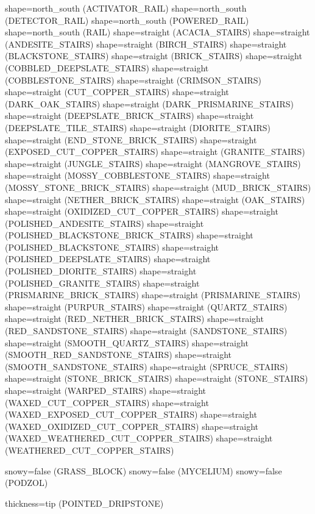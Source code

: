 shape=north_south (ACTIVATOR_RAIL)
shape=north_south (DETECTOR_RAIL)
shape=north_south (POWERED_RAIL)
shape=north_south (RAIL)
shape=straight (ACACIA_STAIRS)
shape=straight (ANDESITE_STAIRS)
shape=straight (BIRCH_STAIRS)
shape=straight (BLACKSTONE_STAIRS)
shape=straight (BRICK_STAIRS)
shape=straight (COBBLED_DEEPSLATE_STAIRS)
shape=straight (COBBLESTONE_STAIRS)
shape=straight (CRIMSON_STAIRS)
shape=straight (CUT_COPPER_STAIRS)
shape=straight (DARK_OAK_STAIRS)
shape=straight (DARK_PRISMARINE_STAIRS)
shape=straight (DEEPSLATE_BRICK_STAIRS)
shape=straight (DEEPSLATE_TILE_STAIRS)
shape=straight (DIORITE_STAIRS)
shape=straight (END_STONE_BRICK_STAIRS)
shape=straight (EXPOSED_CUT_COPPER_STAIRS)
shape=straight (GRANITE_STAIRS)
shape=straight (JUNGLE_STAIRS)
shape=straight (MANGROVE_STAIRS)
shape=straight (MOSSY_COBBLESTONE_STAIRS)
shape=straight (MOSSY_STONE_BRICK_STAIRS)
shape=straight (MUD_BRICK_STAIRS)
shape=straight (NETHER_BRICK_STAIRS)
shape=straight (OAK_STAIRS)
shape=straight (OXIDIZED_CUT_COPPER_STAIRS)
shape=straight (POLISHED_ANDESITE_STAIRS)
shape=straight (POLISHED_BLACKSTONE_BRICK_STAIRS)
shape=straight (POLISHED_BLACKSTONE_STAIRS)
shape=straight (POLISHED_DEEPSLATE_STAIRS)
shape=straight (POLISHED_DIORITE_STAIRS)
shape=straight (POLISHED_GRANITE_STAIRS)
shape=straight (PRISMARINE_BRICK_STAIRS)
shape=straight (PRISMARINE_STAIRS)
shape=straight (PURPUR_STAIRS)
shape=straight (QUARTZ_STAIRS)
shape=straight (RED_NETHER_BRICK_STAIRS)
shape=straight (RED_SANDSTONE_STAIRS)
shape=straight (SANDSTONE_STAIRS)
shape=straight (SMOOTH_QUARTZ_STAIRS)
shape=straight (SMOOTH_RED_SANDSTONE_STAIRS)
shape=straight (SMOOTH_SANDSTONE_STAIRS)
shape=straight (SPRUCE_STAIRS)
shape=straight (STONE_BRICK_STAIRS)
shape=straight (STONE_STAIRS)
shape=straight (WARPED_STAIRS)
shape=straight (WAXED_CUT_COPPER_STAIRS)
shape=straight (WAXED_EXPOSED_CUT_COPPER_STAIRS)
shape=straight (WAXED_OXIDIZED_CUT_COPPER_STAIRS)
shape=straight (WAXED_WEATHERED_CUT_COPPER_STAIRS)
shape=straight (WEATHERED_CUT_COPPER_STAIRS)

snowy=false (GRASS_BLOCK)
snowy=false (MYCELIUM)
snowy=false (PODZOL)

thickness=tip (POINTED_DRIPSTONE)

